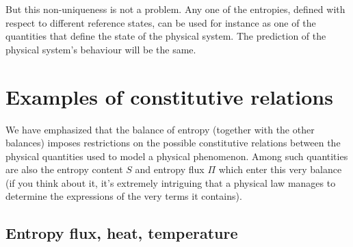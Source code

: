 \documentclass[a4paper,12pt,%
onecolumn,oneside,titlepage,%
british%
]{memoir}
\renewcommand*{\|}[1][]{\nonscript\:#1\vert\nonscript\:\mathopen{}}
\newcommand*{\yS}{S}
\newcommand*{\yB}{\varPi}
\begin{document}
But this non-uniqueness is not a problem. Any one of the entropies, defined with respect to different reference states, can be used for instance as one of the quantities that define the state of the physical system. The prediction of the physical system's behaviour will be the same.

\section{Examples of constitutive relations}
\label{sec:entropy_constitutive}

We have emphasized that the balance of entropy (together with the other balances) imposes restrictions on the possible constitutive relations between the physical quantities used to model a physical phenomenon. Among such quantities are also the entropy content $\yS$ and entropy flux $\yB$ which enter this very balance (if you think about it, it's extremely intriguing that a physical law manages to determine the expressions of the very terms it contains).

\subsection{Entropy flux, heat, temperature}
\label{sec:entropyflux_const}
\end{document}
